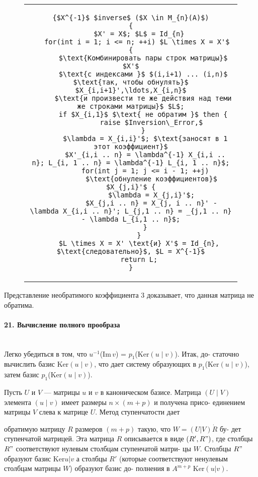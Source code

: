 {\begin{figure}[htp]
\begin{tabular}{c}
\begin{lstlisting}[mathescape=true, captionpos={bo}, caption={Обращение матрицы в кольце главных идеалов}]
{$X^{-1}$ $inverse$ ($X \in M_{n}(A)$)
{
	$X' = X$; $L$ = Id_{n}
   for(int i = 1; i <= n; ++i) $L \times X = X'$ {
      $\text{Комбинировать пары строк матрицы}$ $X'$
      $\text{с индексами }$ $(i,i+1) ... (i,n)$ $\text{так, чтобы обнулять}$ $X_{i,i+1}',\ldots,X_{i,n}$
      $\text{и произвести те же действия над теми же строками матрицы}$ $L$;
      if $X_{i,1}$ $\text{ не обратим }$ then {
          raise $Inversion\_Error,$
      }
	   $\lambda = X_{i,i}'$; $\text{заносят в 1 этот коэффициент}$
	   $X'_{i,i .. n} = \lambda^{-1} X_{i,i .. n}; L_{i, 1 .. n} = \lambda^{-1} L_{i, 1 .. n}$;
	   for(int j = 1; j <= i - 1; ++j)
          $\text{обнуление коэффициентов}$ $X_{j,i}'$ {
	      $\lambda = X_{j,i}'$;
	      $X_{j,i .. n} = X_{j, i .. n}' - \lambda X_{i,i .. n}'; L_{j,1 .. n} = _{j,1 .. n} - \lambda L_{i,1 .. n}$;
	   }
    }
    $L \times X = X' \text{и} X'$ = Id_{n}, $\text{следовательно}$, $L = X^{-1}$
    return L;
}
\end{lstlisting}
\end{tabular}
\end{figure}

\noindent Представление необратимого коэффициента 3 доказывает, что данная
матрица не обратима.

\paragraph{21. Вычисление полного прообраза} \mbox{}\\

Легко убедиться в том, что $u^{-1}$(Im\,$v$) = $p_{1}$(Ker$(u \;|\; v)$). Итак, до-
статочно вычислить базис Ker$(u \;|\; v)$, что дает систему образующих в
$p_{1}$(Ker$(u \;|\; v)$), затем базис $p_{1}$(Ker$(u \;|\; v)$).

Пусть $U$ и $V$ --- матрицы $u$ и $v$ в каноническом базисе. Матрица
$(U \;|\; V)$ элемента $(u \;|\; v)$ имеет размеры $n \times (m+p)$ и получена присо-
единением матрицы $V$ слева к матрице $U$. Метод ступенчатости дает

\noindent обратимую матрицу $R$ размеров $(m+p)$ такую, что $W = (U | V) \dot R$ бу-
дет ступенчатой матрицей. Эта матрица $R$ описывается в виде $(R',R")$,
где столбцы $R"$ соответствуют нулевым столбцам ступенчатой матри-
цы $W$. Столбцы $R"$ образуют базис Ker{$u | v$} а столбцы $R'$ (которые
соответствуют ненулевым столбцам матрицы $W$) образуют базис до-
полнения в $A^{m+p}$ Ker{$(u | v)$}.

}
